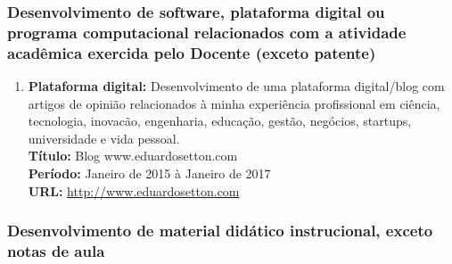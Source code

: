 \documentclass[a4paper,oneside,10pt]{article}
\begin{document}

\subsubsection{Desenvolvimento de software, plataforma digital ou programa computacional relacionados com a atividade acadêmica exercida pelo Docente (exceto patente)}
\vspace{0.3cm}

\begin{enumerate}
\renewcommand{\labelenumi}{{\large\bfseries\arabic{enumi}.}}

 \item   \textbf{Plataforma digital: }  Desenvolvimento de uma plataforma digital/blog com artigos de opinião relacionados à minha experiência profissional em ciência, tecnologia, inovacão, engenharia, educação, gestão, negócios, startups, universidade e vida pessoal.  \mbox{} \\
        \textbf{Título:} Blog www.eduardosetton.com\\
        \textbf{Período:}  Janeiro de 2015 à Janeiro de 2017\\
        \textbf{URL:} \url{http://www.eduardosetton.com}\\
        
  \end{enumerate} 
  

\subsubsection{Desenvolvimento de material didático instrucional, exceto notas de aula}
\vspace{0.3cm}
\end{document}
